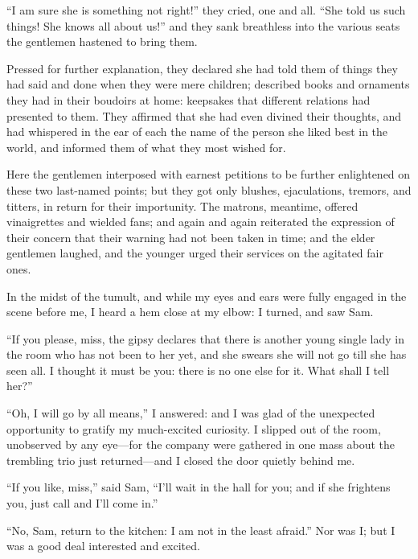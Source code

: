 \enquote{I am sure she is something not right!} they cried, one and
all. \enquote{She told us such things! She knows all about us!} and
they sank breathless into the various seats the gentlemen hastened to
bring them.

Pressed for further explanation, they declared she had told them of
things they had said and done when they were mere children; described
books and ornaments they had in their boudoirs at home: keepsakes that
different relations had presented to them. They affirmed that she had
even divined their thoughts, and had whispered in the ear of each the
name of the person she liked best in the world, and informed them of
what they most wished for.

Here the gentlemen interposed with earnest petitions to be further
enlightened on these two last-named points; but they got only blushes,
ejaculations, tremors, and titters, in return for their importunity. 
The matrons, meantime, offered vinaigrettes and wielded fans; and again
and again reiterated the expression of their concern that their warning
had not been taken in time; and the elder gentlemen laughed, and the
younger urged their services on the agitated fair ones.

In the midst of the tumult, and while my eyes and ears were fully
engaged in the scene before me, I heard a hem close at my elbow: I
turned, and saw Sam.

\enquote{If you please, miss, the gipsy declares that there is another
young single lady in the room who has not been to her yet, and she
swears she will not go till she has seen all. I thought it must be you:
there is no one else for it. What shall I tell her?}

\enquote{Oh, I will go by all means,} I answered: and I was glad of the
unexpected opportunity to gratify my much-excited curiosity. I slipped
out of the room, unobserved by any eye---for the company were gathered
in one mass about the trembling trio just returned---and I closed the
door quietly behind me.

\enquote{If you like, miss,} said Sam, \enquote{I'll wait in the hall
for you; and if she frightens you, just call and I'll come in.}

\enquote{No, Sam, return to the kitchen: I am not in the least afraid.} 
Nor was I; but I was a good deal interested and excited.
